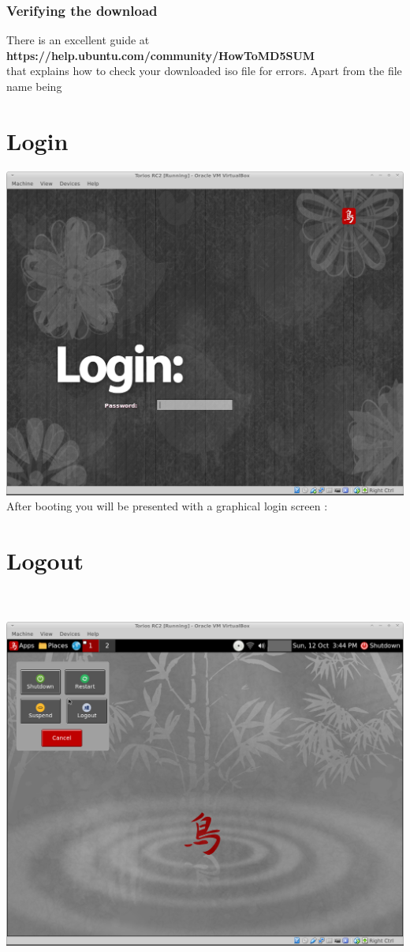 \documentclass[12pt,a4paper]{book}
\begin{document}


\subsection{Verifying the download}
There is an excellent guide at\\ \textbf{https://help.ubuntu.com/community/HowToMD5SUM} \\
that explains how to check your downloaded iso file for errors.  Apart from the file name being\chapter{Login}



\includegraphics[width=0.8\linewidth]{screen-shots/torios-rc2-login-screen} \\

After booting you will be presented with a graphical login screen :

\chapter{Logout}

\\
\\
\includegraphics[width=0.8\linewidth]{screen-shots/torios-rc2-shutdown-menu} \\
\end{document}
